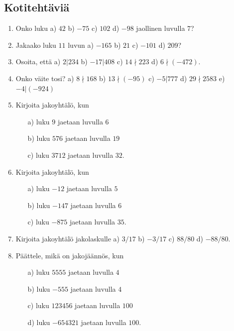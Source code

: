 \subsection*{Kotitehtäviä}

\begin{enumerate}

\item Onko luku a) $42$ b) $-75$ c) $102$ d) $-98$ jaollinen luvulla $7$?

\item Jakaako luku $11$ luvun a) $-165$ b) $21$ c) $-101$ d) $209$?

\item Osoita, että a) $2|234$ b) $-17|408$ c) $14 \nmid 223$ d) $6 \nmid (-472)$.

\item Onko väite tosi? a) $8 \nmid 168$ b) $13 \nmid (-95)$ c) $-5|777$ d) $29\nmid 2583$ e) $-4|(-924)$

\item Kirjoita jakoyhtälö, kun
\begin{itemize}
\item[a)] luku $9$ jaetaan luvulla $6$
\item[b)] luku $576$ jaetaan luvulla $19$
\item[c)] luku $3712$ jaetaan luvulla $32$.
\end{itemize}

\item Kirjoita jakoyhtälö, kun
\begin{itemize}
\item[a)] luku $-12$ jaetaan luvulla $5$
\item[b)] luku $-147$ jaetaan luvulla $6$
\item[c)] luku $-875$ jaetaan luvulla $35$.
\end{itemize}

\item Kirjoita jakoyhtälö jakolaskulle a) $3/17$ b) $-3/17$ c) $88/80$ d) $-88/80$.

\item Päättele, mikä on jakojäännös, kun
\begin{itemize}
\item[a)] luku $5555$ jaetaan luvulla $4$
\item[b)] luku $-555$ jaetaan luvulla $4$
\item[c)] luku $123456$ jaetaan luvulla $100$
\item[d)] luku $-654321$ jaetaan luvulla $100$.
\end{itemize}


\end{enumerate}
